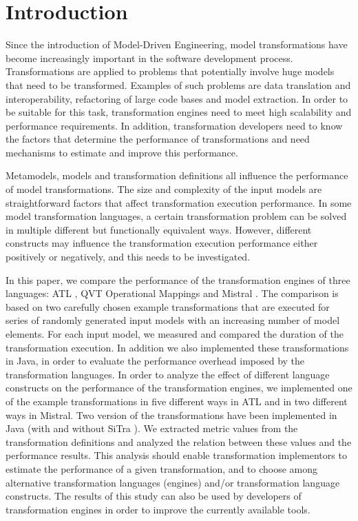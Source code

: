 \documentclass[12pt]{elsarticle}
\begin{document}
\section{Introduction}

Since the introduction of Model-Driven Engineering, model transformations have
become increasingly important in the software development process.
Transformations are applied to problems that potentially involve huge models
that need to be transformed. Examples of such problems are data translation and
interoperability, refactoring of large code bases and model extraction.
In order to be suitable for this task, transformation engines need to meet high
scalability and performance requirements. In addition, transformation developers need to know the factors that determine the performance
of transformations and need mechanisms to estimate and improve this performance.

Metamodels, models and transformation definitions all influence the
performance of model transformations. The size and complexity of
the input models are straightforward factors that affect transformation execution performance.
In some model transformation languages, a certain transformation problem can be solved
in multiple different but functionally equivalent ways. However, different
constructs may influence the transformation execution performance either positively
or negatively, and this needs to be investigated.

In this paper, we compare the performance of the transformation engines of three
languages: ATL \cite{jouault06}, QVT Operational Mappings \cite{qvt_spec} and
Mistral \cite{KurtevB04}. The comparison is based on two carefully chosen
example transformations that are executed for series of randomly generated input
models with an increasing number of model elements. For each input model, we
measured and compared the duration of the transformation execution. In addition
we also implemented these transformations in Java, in order to evaluate the
performance overhead imposed by the transformation languages. In order to
analyze the effect of different language constructs on the performance of the
transformation engines, we implemented one of the example transformations in
five different ways in ATL and in two different ways in Mistral. Two version of the
transformations have been implemented in Java (with and without SiTra
\cite{akehurst2006}). We extracted metric values from the transformation definitions and
analyzed the relation between these values and the performance results. This analysis should
enable transformation implementors to estimate the performance of a given
transformation, and to choose among alternative transformation languages (engines) and/or
transformation language constructs. The results of this study can also be used
by developers of transformation engines in order to improve the currently
available tools.
\end{document}
